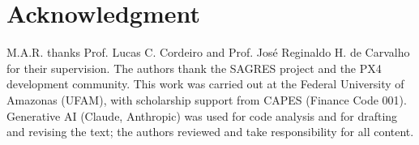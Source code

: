 \documentclass[conference]{IEEEtran}
\newcommand{\corr}[1]{#1}
\begin{document}
\section*{Acknowledgment}
M.A.R. thanks Prof. Lucas C. Cordeiro and Prof. Jos\'e Reginaldo H. de Carvalho for their supervision. The authors thank the SAGRES project and the PX4 development community. This work was carried out at the Federal University of Amazonas (UFAM), with scholarship support from CAPES\corr{ (Finance Code 001)}. Generative AI (Claude, Anthropic) was used for code analysis and for drafting and revising the text; the authors reviewed and take responsibility for all content.


{\scriptsize}
\end{document}
